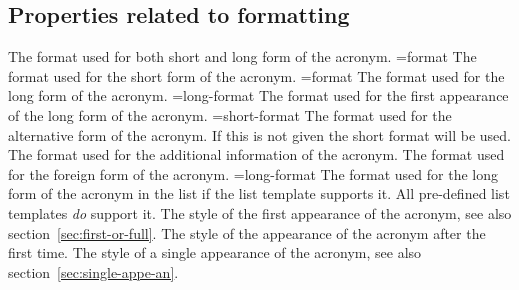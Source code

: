 \documentclass{acro-manual}
\begin{document}
\subsection{Properties related to formatting}\label{sec:prop-relat-form}
\begin{properties}
  \Default
    The format used for both short and long form of the acronym.
  \Default={format}
    The format used for the short form of the acronym.
  \Default={format}
    The format used for the long form of the acronym.
  \Default={long-format}
    The format used for the first appearance of the long form of the acronym.
  \Default={short-format}
    The format used for the alternative form of the acronym. If this is not
    given the short format will be used.
  \Default
    The format used for the additional information of the acronym.
  \Default
    The format used for the foreign form of the acronym.
  \Default={long-format}
    The format used for the long form of the acronym in the list if the list
    template supports it. All pre-defined list templates \emph{do} support
    it.
  \Default
    The style of the first appearance of the acronym, see also
    section~\vref{sec:first-or-full}.
  \Default
    The style of the appearance of the acronym after the
    first time.
  \Default
    The style of a single appearance of the acronym, see also
    section~\vref{sec:single-appe-an}.
\end{properties}
\end{document}
